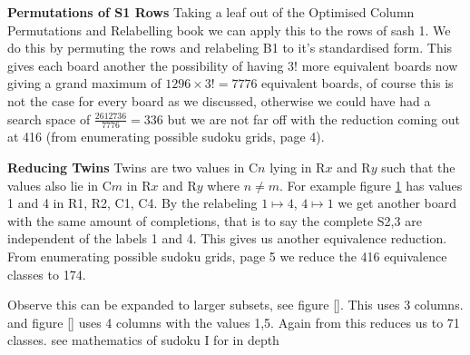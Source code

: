 \documentclass[a4paper,11pt]{report}
\newcounter{row}
\newcounter{col}
\newcounter{rowb}
\newcounter{colb}
\newcommand\setrowb[3]{
  \setcounter{colb}{1}
  \foreach \n in {#1, #2, #3} {
    \edef\x{\value{colb} - 0.5}
    \edef\y{3.5 - \value{rowb}}
    \node[anchor=center] at (\x, \y) {\n};
    \stepcounter{colb}
  }
  \stepcounter{rowb}
}
\begin{document}
{\textbf{Permutations of S1 Rows}
Taking a leaf out of the Optimised Column Permutations and Relabelling book we can apply this to the rows of sash 1. We do this by permuting the rows and relabeling B1 to it's standardised form. This gives each board another the possibility of having $3!$ more equivalent boards now giving a grand maximum of $1296\times 3!=7776$ equivalent boards, of course this is not the case for every board as we discussed, otherwise we could have had a search space of $\frac{2612736}{7776}=336$ but we are not far off with the reduction coming out at 416 (from \cite{}enumerating possible sudoku grids, page 4).

\textbf{Reducing Twins}
Twins are two values in C$n$ lying in R$x$ and R$y$ such that the values also lie in C$m$ in R$x$ and R$y$ where $n\neq m$. For example figure \ref{fig:twins} has values 1 and 4 in R1, R2, C1, C4. By the relabeling $1\mapsto 4$, $4\mapsto 1$ we get another board with the same amount of completions, that is to say the complete S2,3 are independent of the labels 1 and 4. This gives us another equivalence reduction. From \cite{}enumerating possible sudoku grids, page 5 we reduce the 416 equivalence classes to 174.

\begin{figure}[h!]
\centering
{}
\caption{\label{fig:twins}}
\end{figure}

Observe this can be expanded to larger subsets, see figure \ref{}. This uses 3 columns. and figure \ref{} uses 4 columns with the values 1,5. Again from \cite{} this reduces us to 71 classes. see mathematics of sudoku I for in depth

}
\end{document}

